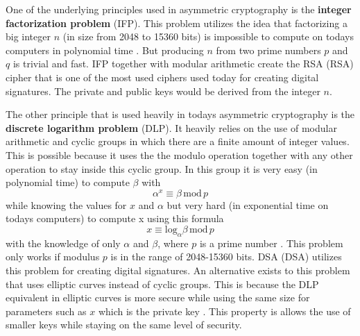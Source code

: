 One of the underlying principles used in asymmetric cryptography is the \textbf{integer factorization problem} (\acs{IFP}). This problem utilizes the idea that factorizing a big integer $n$ (in size from 2048 to 15360 bits) is impossible to compute on todays computers in polynomial time \cite{Paar2010}. But producing $n$ from two prime numbers $p$ and $q$ is trivial and fast. IFP together with modular arithmetic create the RSA (\acl{RSA}) cipher that is one of the most used ciphers used today for creating digital signatures. The private and public keys would be derived from the integer $n$.

The other principle that is used heavily in todays asymmetric cryptography is the \textbf{discrete logarithm problem} (\acs{DLP}). It heavily relies on the use of modular arithmetic and cyclic groups in which there are a finite amount of integer values. This is possible because it uses the the modulo operation together with any other operation to stay inside this cyclic group. In this group it is very easy (in polynomial time) to compute $\beta$ with
\begin{equation}
  \alpha^x\equiv\beta\,\mathrm{mod}\,p
\end{equation}
while knowing the values for $x$ and $\alpha$ but very hard (in exponential time on todays computers) to compute x using this formula
\begin{equation}
  x\equiv\mathrm{log}_\alpha\beta\,\mathrm{mod}\,p
\end{equation}
with the knowledge of only $\alpha$ and $\beta$, where $p$ is a prime number \cite{Paar2010}. This problem only works if modulus $p$ is in the range of 2048-15360 bits. DSA (\acl{DSA}) utilizes this problem for creating digital signatures. An alternative exists to this problem that uses elliptic curves instead of cyclic groups. This is because the DLP equivalent in elliptic curves is more secure while using the same size for parameters such as $x$ which is the private key \cite{Ristic2014}. This property is allows the use of smaller keys while staying on the same level of security.
